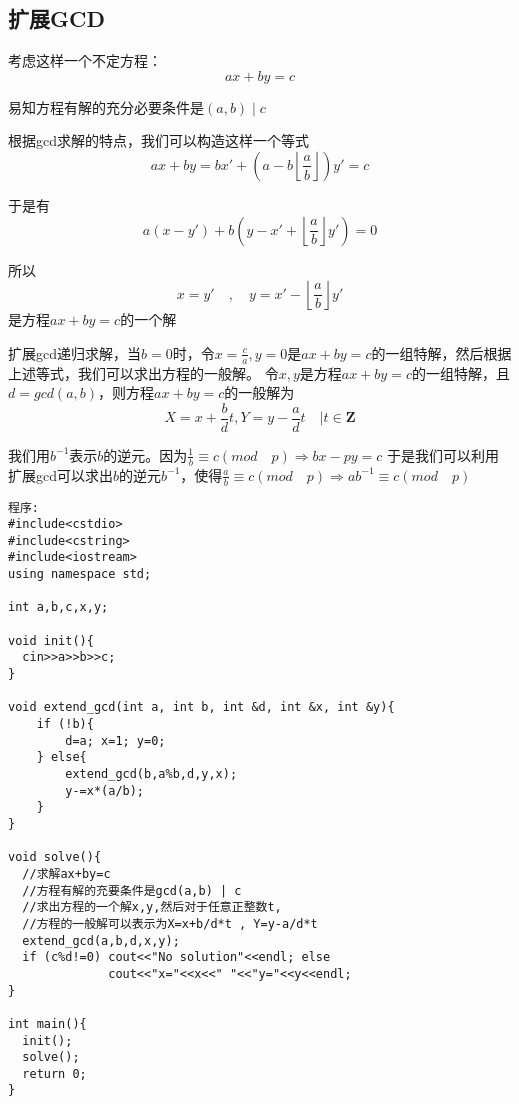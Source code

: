 \subsection{扩展GCD}
考虑这样一个不定方程：$$ax+by=c$$

易知方程有解的充分必要条件是$(a,b) \mid c$

根据gcd求解的特点，我们可以构造这样一个等式 $$ax+by=bx'+\left (a-b\left \lfloor \frac{a}{b} \right \rfloor\right )y'=c$$

于是有 $$a(x-y')+b\left (y-x'+\left \lfloor \frac{a}{b} \right \rfloor y'\right )=0$$

所以$$x=y'\quad , \quad y=x'-\left \lfloor \frac{a}{b} \right \rfloor y'$$
是方程$ax+by=c$的一个解

扩展gcd递归求解，当$b=0$时，令$x=\frac{c}{a},y=0$是$ax+by=c$的一组特解，然后根据上述等式，我们可以求出方程的一般解。
令$x,y$是方程$ax+by=c$的一组特解，且$d=gcd(a,b)$，则方程$ax+by=c$的一般解为$$X=x+\frac{b}{d}t,Y=y-\frac{a}{d}t \quad |t \in{\mathbf{Z}}$$

我们用$b^{-1}$表示$b$的逆元。因为$\frac{1}{b} \equiv c(mod \quad p) \Rightarrow bx-py=c$
于是我们可以利用扩展gcd可以求出$b$的逆元$b^{-1}$，使得$\frac{a}{b}\equiv c(mod \quad p) \Rightarrow ab^{-1}\equiv c(mod \quad p)$

\begin{verbatim}
程序:
#include<cstdio>
#include<cstring>
#include<iostream>
using namespace std;

int a,b,c,x,y;

void init(){
  cin>>a>>b>>c;
}

void extend_gcd(int a, int b, int &d, int &x, int &y){
    if (!b){
        d=a; x=1; y=0;
    } else{
        extend_gcd(b,a%b,d,y,x);
        y-=x*(a/b);
    }
}

void solve(){
  //求解ax+by=c
  //方程有解的充要条件是gcd(a,b) | c
  //求出方程的一个解x,y,然后对于任意正整数t,
  //方程的一般解可以表示为X=x+b/d*t , Y=y-a/d*t
  extend_gcd(a,b,d,x,y);
  if (c%d!=0) cout<<"No solution"<<endl; else
              cout<<"x="<<x<<" "<<"y="<<y<<endl;
}

int main(){
  init();
  solve();
  return 0;
}
\end{verbatim}
